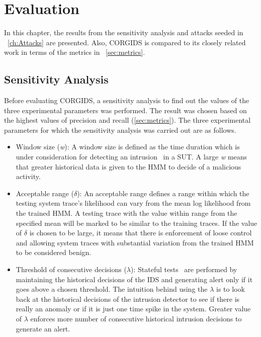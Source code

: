 
\chapter{\textbf{Evaluation}}
\label{sec6:Evaluation}
In this chapter, the results from the sensitivity analysis and attacks seeded in ~\autoref{ch:Attacks} are presented. Also, CORGIDS is compared to its closely related work in terms of the metrics in ~\autoref{sec:metrics}.

\section{Sensitivity Analysis}
\label{sensitivityAnalysis}

Before evaluating CORGIDS, a sensitivity analysis to find out the values of the three experimental parameters was performed.  The result was chosen based on the highest values of precision and recall (\autoref{sec:metrics}). The three experimental parameters for which the sensitivity analysis was carried out are as follows.
\begin{itemize}
\item Window size (\textit{w}): A window size is defined as the time duration which is under consideration for detecting an intrusion~\cite{zohrevand2016hidden} in a SUT. A large \textit{w} means that greater historical data is given to the HMM to decide of a malicious activity.
\item Acceptable range ($\delta$): An acceptable range defines a range within which the testing system trace's likelihood can vary from the mean log likelihood from the trained HMM. A testing trace with the value within range from the specified mean will be marked to be similar to the training traces. If the value of $\delta$ is chosen to be large, it means that there is enforcement of loose control and allowing system traces with substantial variation from the trained HMM to be considered benign.
\item Threshold of consecutive decisions ($\lambda$): Stateful tests~\cite{urbina2016limiting} are performed by maintaining the historical decisions of the IDS and generating alert only if it goes above a chosen threshold. The intuition behind using the $\lambda$ is to look back at the historical decisions of the intrusion detector to see if there is really an anomaly or if it is just one time spike in the system. Greater value of $\lambda$ enforces more number of consecutive historical intrusion decisions to generate an alert.
\end{itemize}

